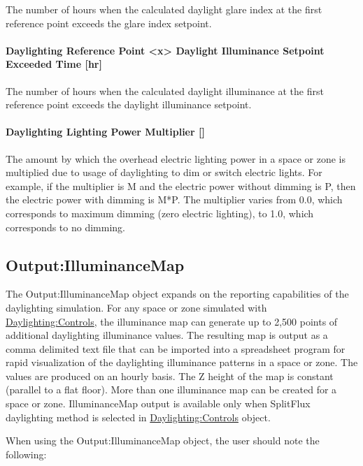 The number of hours when the calculated daylight glare index at the first reference point exceeds the glare index setpoint.

\paragraph{Daylighting Reference Point <x> Daylight Illuminance Setpoint Exceeded Time {[}hr{]}}\label{daylighting-reference-point-1-daylight-illuminance-setpoint-exceeded-time-hr}

The number of hours when the calculated daylight illuminance at the first reference point exceeds the daylight illuminance setpoint.

\paragraph{Daylighting Lighting Power Multiplier {[]}}\label{daylighting-lighting-power-multiplier-1}

The amount by which the overhead electric lighting power in a space or zone is multiplied due to usage of daylighting to dim or switch electric lights. For example, if the multiplier is M and the electric power without dimming is P, then the electric power with dimming is M*P. The multiplier varies from 0.0, which corresponds to maximum dimming (zero electric lighting), to 1.0, which corresponds to no dimming.

\subsection{Output:IlluminanceMap}\label{outputilluminancemap}

The Output:IlluminanceMap object expands on the reporting capabilities of the daylighting simulation. For any space or zone simulated with \hyperref[daylightingcontrols-000]{Daylighting:Controls}, the illuminance map can generate up to 2,500 points of additional daylighting illuminance values. The resulting map is output as a comma delimited text file that can be imported into a spreadsheet program for rapid visualization of the daylighting illuminance patterns in a space or zone. The values are produced on an hourly basis. The Z height of the map is constant (parallel to a flat floor). More than one illuminance map can be created for a space or zone. IlluminanceMap output is available only when SplitFlux daylighting method is selected in \hyperref[daylightingcontrols-000]{Daylighting:Controls} object.

When using the Output:IlluminanceMap object, the user should note the following:

